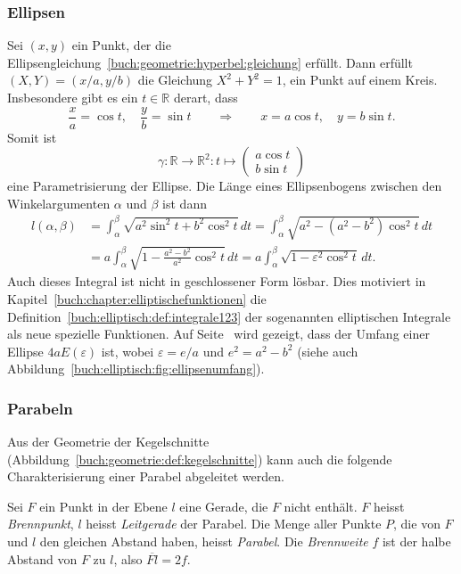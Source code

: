\subsubsection{Ellipsen}
Sei $(x,y)$ ein Punkt, der die
Ellipsengleichung~\eqref{buch:geometrie:hyperbel:gleichung} erfüllt.
Dann erfüllt $(X,Y)=(x/a, y/b)$ die Gleichung $X^2+Y^2=1$, ein Punkt auf
einem Kreis.
Insbesondere gibt es ein $t\in\mathbb{R}$ derart, dass
\[
\frac{x}{a} = \cos t ,\quad \frac{y}{b}=\sin t
\qquad\Rightarrow\qquad
x=a\cos t,\quad y=b\sin t.
\]
Somit ist
\[
\gamma
\colon
\mathbb{R}\to\mathbb{R}^2
:
t \mapsto\begin{pmatrix}a\cos t\\b\sin t\end{pmatrix}
\]
eine Parametrisierung der Ellipse.
Die Länge eines Ellipsenbogens zwischen den Winkelargumenten $\alpha$ und
$\beta$ ist dann
\begin{align*}
l(\alpha,\beta)
&=
\int_\alpha^\beta
\sqrt{
a^2 \sin^2 t + b^2 \cos^2t
}
\,dt
=
\int_\alpha^\beta
\sqrt{
a^2 - (a^2-b^2)\cos^2 t
}
\,dt
\\
&=
a
\int_\alpha^\beta
\sqrt{
1 - \frac{a^2-b^2}{a^2} \cos^2t
}
\,dt
=
a\int_\alpha^\beta
\sqrt{
1-\varepsilon^2 \cos^2t
}
\,dt.
\end{align*}
Auch dieses Integral ist nicht in geschlossener Form lösbar.
Dies motiviert in Kapitel~\ref{buch:chapter:elliptischefunktionen}
die Definition~\ref{buch:elliptisch:def:integrale123}
der sogenannten elliptischen Integrale als neue
spezielle Funktionen.
Auf Seite~\pageref{buch:elliptisch:fig:ellipsenumfang} wird gezeigt,
dass der Umfang einer Ellipse $4aE(\varepsilon)$ ist,
wobei $\varepsilon=e/a$ und $e^2=a^2-b^2$ (siehe auch
Abbildung~\ref{buch:elliptisch:fig:ellipsenumfang}).

\subsubsection{Parabeln}
Aus der Geometrie der Kegelschnitte
(Abbildung~\ref{buch:geometrie:def:kegelschnitte})
kann auch die folgende Charakterisierung einer Parabel abgeleitet werden.

\begin{definition}
\label{buch:geometrie:def:parabel}
Sei $F$ ein Punkt in der Ebene $l$ eine Gerade, die $F$ nicht enthält.
$F$ heisst {\em Brennpunkt}, $l$ heisst {\em Leitgerade} der Parabel.
Die Menge aller Punkte $P$, die von $F$ und $l$ den gleichen
Abstand haben, heisst {\em Parabel}.
Die {\em Brennweite} $f$ ist der halbe Abstand von $F$ zu $l$,
also $\overline{Fl}=2f$.
\end{definition}

